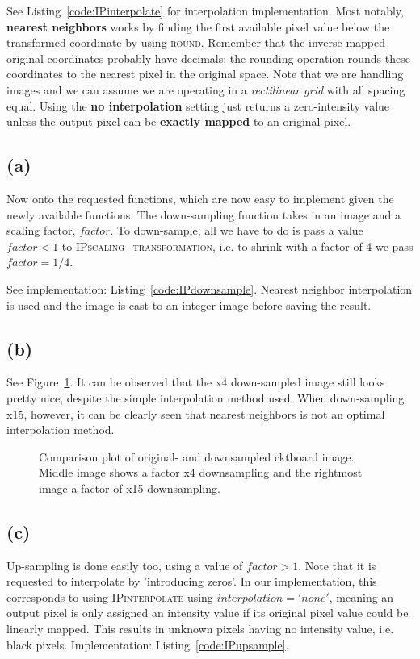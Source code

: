 \documentclass{article}
\begin{document}
 See Listing~\ref{code:IPinterpolate} for interpolation implementation. Most notably, \textbf{nearest neighbors} works by finding the first available pixel value below the transformed coordinate by using \textsc{round}. Remember that the inverse mapped original coordinates probably have decimals; the rounding operation rounds these coordinates to the nearest pixel in the original space. Note that we are handling images and we can assume we are operating in a \textit{rectilinear grid} with all spacing equal. Using the \textbf{no interpolation} setting just returns a zero-intensity value unless the output pixel can be \textbf{exactly mapped} to an original pixel.

\subsection*{(a)} Now onto the requested functions, which are now easy to implement given the newly available functions. The down-sampling function takes in an image and a scaling factor, $factor$. To down-sample, all we have to do is pass a value $factor < 1$ to \textsc{IPscaling\_transformation}, i.e. to shrink with a factor of 4 we pass $factor = 1/4$.

 See implementation: Listing~\ref{code:IPdownsample}. Nearest neighbor interpolation is used and the image is cast to an integer image before saving the result.

\subsection*{(b)} See Figure~\ref{fig:downsampling}. It can be observed that the x4 down-sampled image still looks pretty nice, despite the simple interpolation method used. When down-sampling x15, however, it can be clearly seen that nearest neighbors is not an optimal interpolation method.
\begin{figure}[ht]
    \centering
    
    \caption{Comparison plot of original- and downsampled cktboard image. Middle image shows a factor x4 downsampling and the rightmost image a factor of x15 downsampling.}
    \label{fig:downsampling}
\end{figure}

\subsection*{(c)} Up-sampling is done easily too, using a value of $factor > 1$. Note that it is requested to interpolate by 'introducing zeros'. In our implementation, this corresponds to using \textsc{IPinterpolate} using $interpolation = 'none'$, meaning an output pixel is only assigned an intensity value if its original pixel value could be linearly mapped. This results in unknown pixels having no intensity value, i.e. black pixels.  Implementation: Listing~\ref{code:IPupsample}.
\end{document}
